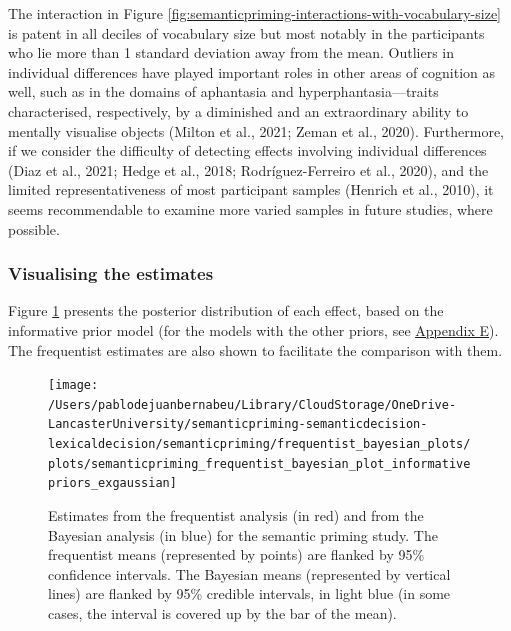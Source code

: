 \documentclass[
  12pt,
  man,floatsintext]{apa7}
\begin{document}
The interaction in Figure \ref{fig:semanticpriming-interactions-with-vocabulary-size} is patent in all deciles of vocabulary size but most notably in the participants who lie more than 1 standard deviation away from the mean. Outliers in individual differences have played important roles in other areas of cognition as well, such as in the domains of aphantasia and hyperphantasia---traits characterised, respectively, by a diminished and an extraordinary ability to mentally visualise objects (Milton et al., 2021; Zeman et al., 2020). Furthermore, if we consider the difficulty of detecting effects involving individual differences (Diaz et al., 2021; Hedge et al., 2018; Rodríguez-Ferreiro et al., 2020), and the limited representativeness of most participant samples (Henrich et al., 2010), it seems recommendable to examine more varied samples in future studies, where possible.

\hypertarget{visualising-the-estimates}{%
\subsubsection{Visualising the estimates}\label{visualising-the-estimates}}

Figure \ref{fig:semanticpriming-frequentist-bayesian-plot-informativepriors-exgaussian} presents the posterior distribution of each effect, based on the informative prior model (for the models with the other priors, see \protect\hyperlink{appendix-E-Bayesian-analysis-results}{\underline{Appendix E}}). The frequentist estimates are also shown to facilitate the comparison with them.

\begin{figure}

{\centering \texttt{[image: /Users/pablodejuanbernabeu/Library/CloudStorage/OneDrive-LancasterUniversity/semanticpriming-semanticdecision-lexicaldecision/semanticpriming/frequentist\_bayesian\_plots/plots/semanticpriming\_frequentist\_bayesian\_plot\_informativepriors\_exgaussian]} 

}

\caption{Estimates from the frequentist analysis (in red) and from the Bayesian analysis (in blue) for the semantic priming study. The frequentist means (represented by points) are flanked by 95\% confidence intervals. The Bayesian means (represented by vertical lines) are flanked by 95\% credible intervals, in light blue (in some cases, the interval is covered up by the bar of the mean).}\label{fig:semanticpriming-frequentist-bayesian-plot-informativepriors-exgaussian}
\end{figure}
\end{document}
